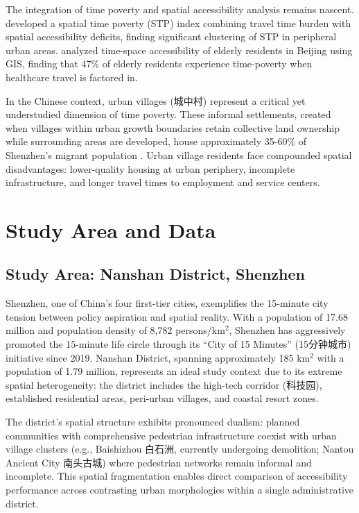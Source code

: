 \documentclass[preprint,12pt,authoryear]{elsarticle}
\begin{document}
The integration of time poverty and spatial accessibility analysis remains nascent. \citet{pineda2020time} developed a spatial time poverty (STP) index combining travel time burden with spatial accessibility deficits, finding significant clustering of STP in peripheral urban areas. \citet{li2022time} analyzed time-space accessibility of elderly residents in Beijing using GIS, finding that 47\% of elderly residents experience time-poverty when healthcare travel is factored in.

In the Chinese context, urban villages (城中村) represent a critical yet understudied dimension of time poverty. These informal settlements, created when villages within urban growth boundaries retain collective land ownership while surrounding areas are developed, house approximately 35-60\% of Shenzhen's migrant population \citep{wu2008housing}. Urban village residents face compounded spatial disadvantages: lower-quality housing at urban periphery, incomplete infrastructure, and longer travel times to employment and service centers.

\section{Study Area and Data}
\label{sec:study_area}

\subsection{Study Area: Nanshan District, Shenzhen}
\label{sec:study_area_nanshan}

Shenzhen, one of China's four first-tier cities, exemplifies the 15-minute city tension between policy aspiration and spatial reality. With a population of 17.68 million and population density of 8,782 persons/km$^2$, Shenzhen has aggressively promoted the 15-minute life circle through its ``City of 15 Minutes'' (15分钟城市) initiative since 2019. Nanshan District, spanning approximately 185 km$^2$ with a population of 1.79 million, represents an ideal study context due to its extreme spatial heterogeneity: the district includes the high-tech corridor (科技园), established residential areas, peri-urban villages, and coastal resort zones.

The district's spatial structure exhibits pronounced dualism: planned communities with comprehensive pedestrian infrastructure coexist with urban village clusters (e.g., Baishizhou 白石洲, currently undergoing demolition; Nantou Ancient City 南头古城) where pedestrian networks remain informal and incomplete. This spatial fragmentation enables direct comparison of accessibility performance across contrasting urban morphologies within a single administrative district.
\end{document}
